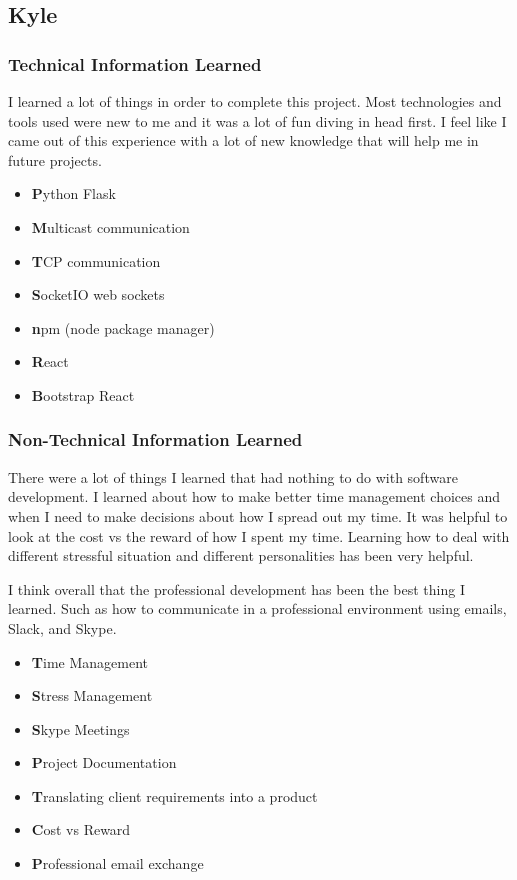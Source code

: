 \documentclass[draftclsnofoot, onecolumn, compsoc, 10pt]{IEEEtran}
\begin{document}


\subsection{Kyle}
\subsubsection{Technical Information Learned}
I learned a lot of things in order to complete this project. Most technologies and tools used were new to me and it was a lot of fun diving in head first. I feel like I came out of this experience with a lot of new knowledge that will help me in future projects.
\begin{itemize}
    \item \textbf Python Flask
    \item \textbf Multicast communication
    \item \textbf TCP communication
    \item \textbf SocketIO web sockets
    \item \textbf npm (node package manager)
    \item \textbf React
    \item \textbf Bootstrap React
\end{itemize}
\subsubsection{Non-Technical Information Learned}
There were a lot of things I learned that had nothing to do with software development. I learned about how to make better time management choices and when I need to make decisions about how I spread out my time. It was helpful to look at the cost vs the reward of how I spent my time. Learning how to deal with different stressful situation and different personalities has been very helpful.

I think overall that the professional development has been the best thing I learned. Such as how to communicate in a professional environment using emails, Slack, and Skype.
\begin{itemize}
    \item \textbf Time Management
    \item \textbf Stress Management
    \item \textbf Skype Meetings
    \item \textbf Project Documentation
    \item \textbf Translating client requirements into a product
    \item \textbf Cost vs Reward
    \item \textbf Professional email exchange
\end{itemize}
\end{document}
